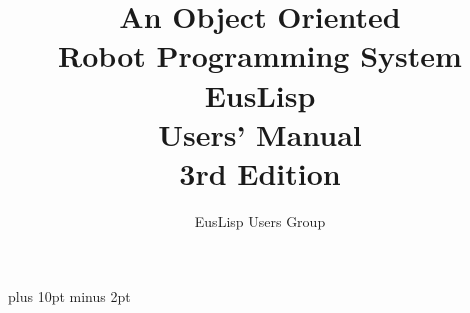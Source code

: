 \pagestyle{plain}
\oddsidemargin=0cm
\evensidemargin=0cm
\textwidth=16cm
\textheight=24cm
\jintercharskip=0pt plus 10pt minus 2pt

\title{An Object Oriented \\
	Robot Programming System \\
	EusLisp \\
	Users' Manual \\
	3rd Edition}

\author{EusLisp Users Group}

	


\addtolength{\jasciikanjiskip}{1mm}

\maketitle



\tableofcontents
\vfill
\pagebreak













